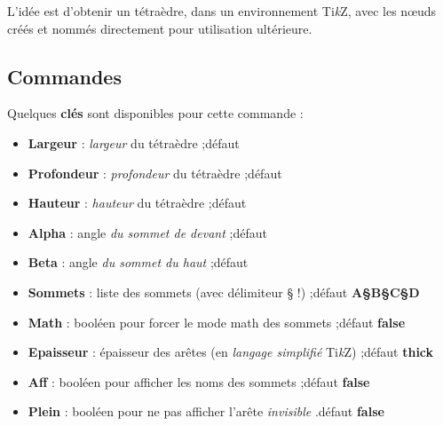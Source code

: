 \documentclass[a4paper,french,11pt]{article}
\providecommand\tikzlogo{Ti\textit{k}Z}
\let\TikZ\tikzlogo
\newcommand\Cle[1]{{\bfseries\sffamily\textlangle #1\textrangle}}
\begin{document}
\begin{codeidee}
L'idée est d'obtenir un tétraèdre, dans un environnement \TikZ, avec les nœuds créés et nommés directement pour utilisation ultérieure.
\end{codeidee}

\subsection{Commandes}

\begin{codetex}
\end{codetex}

\begin{codecles}
Quelques \Cle{clés} sont disponibles pour cette commande :

\begin{itemize}
	\item \Cle{Largeur} : \textit{largeur} du tétraèdre ;\hfill{}défaut \Cle{4}
	\item \Cle{Profondeur} : \textit{profondeur} du tétraèdre ;\hfill{}défaut \Cle{1.25}
	\item \Cle{Hauteur} : \textit{hauteur} du tétraèdre ;\hfill{}défaut \Cle{3}
	\item \Cle{Alpha} : angle \textit{du sommet de devant} ;\hfill{}défaut \Cle{40}
	\item \Cle{Beta} : angle \textit{du sommet du haut} ;\hfill{}défaut \Cle{60}
	\item \Cle{Sommets} : liste des sommets (avec délimiteur § !) ;\hfill{}défaut \Cle{A§B§C§D}
	\item \Cle{Math} : booléen pour forcer le mode math des sommets ;\hfill{}défaut \Cle{false}
	\item \Cle{Epaisseur} : épaisseur des arêtes (en \textit{langage simplifié} \TikZ) ;\hfill{}défaut \Cle{thick}
	\item \Cle{Aff} : booléen pour afficher les noms des sommets ;\hfill{}défaut \Cle{false}
	\item \Cle{Plein} : booléen pour ne pas afficher l'arête \textit{invisible} .\hfill{}défaut \Cle{false}
\end{itemize}
\end{codecles}

\begin{codetex}
\TetraedreTikz
\end{codetex}
\end{document}
